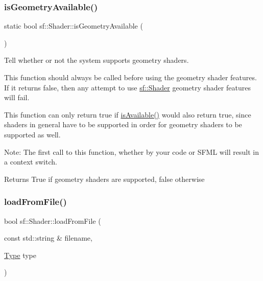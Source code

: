 \subsubsection{\texorpdfstring{isGeometryAvailable()}{isGeometryAvailable()}}
{\footnotesize\ttfamily static bool sf\+::\+Shader\+::is\+Geometry\+Available (\begin{DoxyParamCaption}{ }\end{DoxyParamCaption})\hspace{0.3cm}{\ttfamily [static]}}



Tell whether or not the system supports geometry shaders. 

This function should always be called before using the geometry shader features. If it returns false, then any attempt to use \mbox{\hyperlink{classsf_1_1_shader}{sf\+::\+Shader}} geometry shader features will fail.

This function can only return true if \mbox{\hyperlink{classsf_1_1_shader_ad22474690bafe4a305c1b9826b1bd86a}{is\+Available()}} would also return true, since shaders in general have to be supported in order for geometry shaders to be supported as well.

Note\+: The first call to this function, whether by your code or S\+F\+ML will result in a context switch.

\begin{DoxyReturn}{Returns}
True if geometry shaders are supported, false otherwise \begin{DoxyVerb}\end{DoxyVerb}
 
\end{DoxyReturn}
\mbox{\label{classsf_1_1_shader_a053a5632848ebaca2fcd8ba29abe9e6e}} 
\subsubsection{\texorpdfstring{loadFromFile()}{loadFromFile()}\hspace{0.1cm}{\footnotesize\ttfamily [1/3]}}
{\footnotesize\ttfamily bool sf\+::\+Shader\+::load\+From\+File (\begin{DoxyParamCaption}\item[{const std\+::string \&}]{filename,  }\item[{\mbox{\hyperlink{classsf_1_1_shader_afaa1aa65e5de37b74d047da9def9f9b3}{Type}}}]{type }\end{DoxyParamCaption})}



